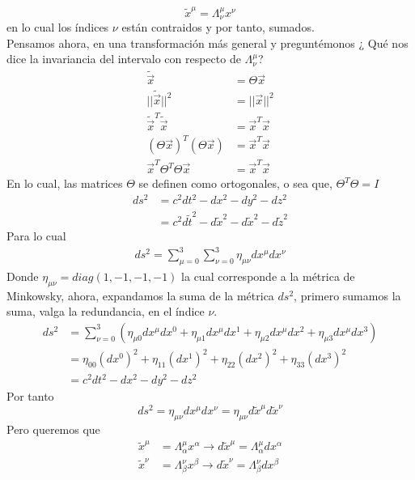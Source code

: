 \documentclass[../main.tex]{subfiles}
\begin{document}
\begin{equation}
  \tilde{x}^\mu=\Lambda^\mu_\nu x^\nu
\end{equation}
en lo cual los índices $\nu$ están contraidos y por tanto, sumados. \\
Pensamos ahora, en una transformación más general y preguntémonos ¿ Qué nos dice la invariancia del intervalo con respecto de $\Lambda^\mu_\nu$?
\begin{align*}
  \tilde{\vec{x}} &  = \Theta \vec{x} \\
  ||\tilde{\vec{x}}||^2 & = ||\vec{x}||^2 \\
  \tilde{\vec{x}}^T\tilde{\vec{x}} & = \vec{x}^T\vec{x} \\
  (\Theta\vec{x})^T(\Theta\vec{x}) & = \vec{x}^T\vec{x} \\
  \vec{x}^T\Theta^T\Theta\vec{x}   & = \vec{x}^T\vec{x} 
\end{align*}
En lo cual, las matrices $\Theta$ se definen como ortogonales, o sea que, $\Theta^T\Theta= I$
\begin{align*}
  ds^2  & = c^2dt^2 - dx^2 - dy^2 - dz^2 \\
  & = c^2d\tilde{t}^2 - d\tilde{x}^2 - d\tilde{x}^2 - d\tilde{z}^2
\end{align*}
Para lo cual
\begin{align*}
  ds^2 = \sum_{\mu=0}^3\sum_{\nu=0}^3\eta_{\mu \nu}dx^\mu dx^\nu
\end{align*}
Donde $\eta_{\mu \nu} = diag(1,-1,-1,-1)$ la cual corresponde a la métrica de Minkowsky, ahora, expandamos la suma de la métrica $ds^2$, primero sumamos la suma, valga la redundancia, en el índice $\nu$.
\begin{align*}
  ds^2  & = \sum_{\nu=0}^3 \left( \eta_{\mu 0}dx^\mu dx^0 + \eta_{\mu 1}dx^\mu dx^1 + \eta_{\mu 2}dx^\mu dx^2 + \eta_{\mu 3}dx^\mu dx^3 \right) \\
  & = \eta_{00}(dx^0)^2 + \eta_{11}(dx^1)^2 + \eta_{22}(dx^2)^2 + \eta_{33}(dx^3)^2 \\
  & = c^2dt^2-dx^2-dy^2-dz^2
\end{align*}
Por tanto
\begin{equation*}
  ds^2 = \eta_{\mu \nu }dx^\mu dx^\nu = \eta_{\mu \nu } d\tilde{x}^\mu d\tilde{x}^\nu 
\end{equation*}
Pero queremos que
\begin{align*}
  \tilde{x}^\mu & = \Lambda_\alpha^\mu x^\alpha \rightarrow d\tilde{x}^\mu = \Lambda^\mu_\alpha dx^\alpha \\
  \tilde{x}^\nu & = \Lambda_\beta^\nu x^\beta \rightarrow d\tilde {x}^\nu   = \Lambda_\beta^\nu dx^\beta 
\end{align*}
\end{document}
